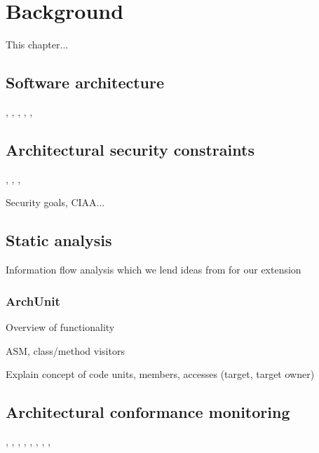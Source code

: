 \chapter{Background}

This chapter...

\section{Software architecture}
\cite{ambriola_introduction_1993}, \cite{jansen_software_2005}, \cite{bass_software_2013}, \cite{scandariato_architecting_2009}, \cite{nguyen_sospa_2015}, 

\section{Architectural security constraints}
\cite{broy_software_2007}, \cite{felderer_security_2016}, \cite{haley_security_2008}, 

Security goals, CIAA...

\section{Static analysis}

Information flow analysis \cite{hutchison_information_2005} which we lend ideas from for our extension

\subsection{ArchUnit}\label{archunit-back-section}

Overview of functionality

ASM, class/method visitors

Explain concept of code units, members, accesses (target, target owner)

\section{Architectural conformance monitoring}
\cite{aldrich_archjava_2002}, \cite{abi-antoun_analyzing_2010}, \cite{luckham_event-based_1995}, \cite{abi-antoun_static_2009}, \cite{de_silva_controlling_2012}, \cite{knodel_comparison_2007}, \cite{jansen_documenting_2008}, \cite{hong_yan_discotect_2004}, 



